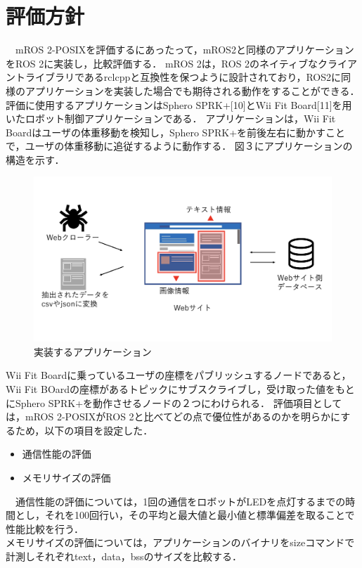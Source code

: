\documentclass[11pt]{ujarticle}
\begin{document}
\section{評価方針}
　mROS 2-POSIXを評価するにあったって，mROS2と同様のアプリケーションをROS 2に実装し，比較評価する．
mROS 2は，ROS 2のネイティブなクライアントライブラリであるrclcppと互換性を保つように設計されており，ROS2に同様のアプリケーションを実装した場合でも期待される動作をすることができる．
評価に使用するアプリケーションはSphero SPRK+[10]とWii Fit Board[11]を用いたロボット制御アプリケーションである．
アプリケーションは，Wii Fit Boardはユーザの体重移動を検知し，Sphero SPRK+を前後左右に動かすことで，ユーザの体重移動に追従するように動作する．
図３にアプリケーションの構造を示す．
\begin{figure}[h]
	\includegraphics[width=0.9\linewidth]{./src/selenium.png}
	\caption{実装するアプリケーション}
  \label{fig:arch}
\end{figure}
Wii Fit Boardに乗っているユーザの座標をパブリッシュするノードであると，Wii Fit BOardの座標があるトピックにサブスクライブし，受け取った値をもとにSphero SPRK+を動作させるノードの２つにわけられる．
評価項目としては，mROS 2-POSIXがROS 2と比べてどの点で優位性があるのかを明らかにするため，以下の項目を設定した．
\begin{itemize}
	\item 通信性能の評価
	\item メモリサイズの評価
\end{itemize}
　通信性能の評価については，1回の通信をロボットがLEDを点灯するまでの時間とし，それを100回行い，その平均と最大値と最小値と標準偏差を取ることで性能比較を行う．
\\メモリサイズの評価については，アプリケーションのバイナリをsizeコマンドで計測しそれぞれtext，data，bssのサイズを比較する．
\end{document}
